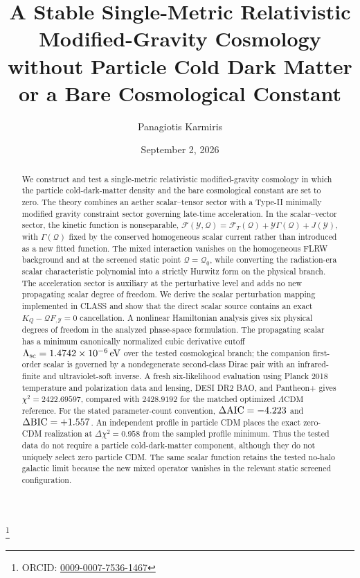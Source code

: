 \documentclass[aps,prd,twocolumn,superscriptaddress,nofootinbib,longbibliography,floatfix]{revtex4-2}
\newcommand{\Y}{\mathcal{Y}}
\newcommand{\Q}{\mathcal{Q}}
\newcommand{\FT}{\mathcal{F}_{T}}
\newcommand{\Ffull}{\mathcal{F}}
\newcommand{\LCDM}{\Lambda\mathrm{CDM}}
\begin{document}
\title{A Stable Single-Metric Relativistic Modified-Gravity Cosmology without Particle Cold Dark Matter or a Bare Cosmological Constant}

\author{Panagiotis Karmiris}
\thanks{ORCID: \href{https://orcid.org/0009-0007-7536-1467}{0009-0007-7536-1467}}

\date{September 2, 2026}

\begin{abstract}
We construct and test a single-metric relativistic modified-gravity cosmology in which the particle cold-dark-matter density and the bare cosmological constant are set to zero. The theory combines an aether scalar--tensor sector with a Type-II minimally modified gravity constraint sector governing late-time acceleration. In the scalar--vector sector, the kinetic function is nonseparable, $\Ffull(\Y,\Q)=\FT(\Q)+\Y\Gamma(\Q)+J(\Y)$, with $\Gamma(\Q)$ fixed by the conserved homogeneous scalar current rather than introduced as a new fitted function. The mixed interaction vanishes on the homogeneous FLRW background and at the screened static point $\Q=\Q_0$, while converting the radiation-era scalar characteristic polynomial into a strictly Hurwitz form on the physical branch. The acceleration sector is auxiliary at the perturbative level and adds no new propagating scalar degree of freedom. We derive the scalar perturbation mapping implemented in CLASS and show that the direct scalar source contains an exact $K_Q-\Q F_{,\Y}=0$ cancellation. A nonlinear Hamiltonian analysis gives six physical degrees of freedom in the analyzed phase-space formulation. The propagating scalar has a minimum canonically normalized cubic derivative cutoff $\Lambda_{\rm sc}=1.4742\times10^{-6}\,{\rm eV}$ over the tested cosmological branch; the companion first-order scalar is governed by a nondegenerate second-class Dirac pair with an infrared-finite and ultraviolet-soft inverse. A fresh six-likelihood evaluation using Planck 2018 temperature and polarization data and lensing, DESI DR2 BAO, and Pantheon+ gives $\chi^2=2422.69597$, compared with $2428.9192$ for the matched optimized $\LCDM$ reference. For the stated parameter-count convention, $\Delta{\rm AIC}=-4.223$ and $\Delta{\rm BIC}=+1.557$. An independent profile in particle CDM places the exact zero-CDM realization at $\Delta\chi^2=0.958$ from the sampled profile minimum. Thus the tested data do not require a particle cold-dark-matter component, although they do not uniquely select zero particle CDM. The same scalar function retains the tested no-halo galactic limit because the new mixed operator vanishes in the relevant static screened configuration.
\end{abstract}
\end{document}
